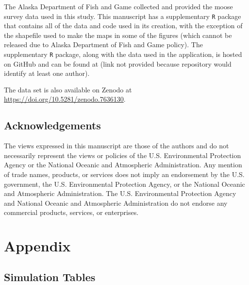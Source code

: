 \documentclass[]{article}    %
\begin{document}
The Alaska Department of Fish and Game collected and provided the moose
survey data used in this study. This manuscript has a supplementary
\texttt{R} package that contains all of the data and code used in its
creation, with the exception of the shapefile used to make the maps in
some of the figures (which cannot be released due to Alaska Department
of Fish and Game policy). The supplementary \texttt{R} package, along
with the data used in the application, is hosted on GitHub and can be
found at (link not provided because repository would identify at least
one author).

The data set is also available on Zenodo at
\url{https://doi.org/10.5281/zenodo.7636130}.

\hypertarget{acknowledgements}{%
\subsection*{Acknowledgements}\label{acknowledgements}}

The views expressed in this manuscript are those of the authors and do
not necessarily represent the views or policies of the U.S.
Environmental Protection Agency or the National Oceanic and Atmospheric
Administration. Any mention of trade names, products, or services does
not imply an endorsement by the U.S. government, the U.S. Environmental
Protection Agency, or the National Oceanic and Atmospheric
Administration. The U.S. Environmental Protection Agency and National
Oceanic and Atmospheric Administration do not endorse any commercial
products, services, or enterprises.



\setcounter{table}{0}
\setcounter{subsection}{0}
\renewcommand{\thetable}{A\arabic{table}}
\renewcommand{\thesubsection}{A.\arabic{subsection}:}

\hypertarget{appendix}{%
\section*{Appendix}\label{appendix}}

\subsection{Simulation Tables}
\end{document}
